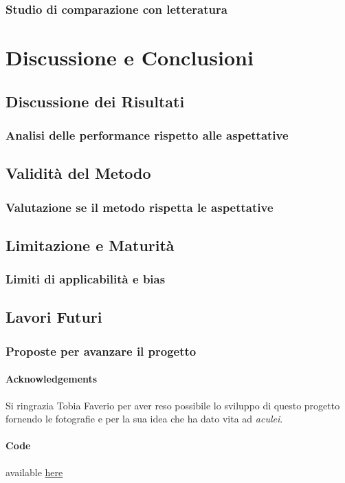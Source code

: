 \documentclass[12pt,a4paper,twoside]{article}
\begin{document}
\subsubsection{Studio di comparazione con letteratura}

\newpage
\section{Discussione e Conclusioni}

\subsection{Discussione dei Risultati}
\subsubsection{Analisi delle performance rispetto alle aspettative}

\subsection{Validità del Metodo}
\subsubsection{Valutazione se il metodo rispetta le aspettative}

\subsection{Limitazione e Maturità}
\subsubsection{Limiti di applicabilità e bias}

\subsection{Lavori Futuri}
\subsubsection{Proposte per avanzare il progetto}

\newpage
\paragraph{Acknowledgements} Si ringrazia Tobia Faverio per aver reso possibile lo sviluppo di 
questo progetto fornendo le fotografie e per la sua idea che ha dato vita ad \textit{aculei}.

\paragraph{Code} available \href{https://gitlab.com/micheledinelli/aculei-ai}{here}

\newpage
\begin{refcontext}[sorting=none]
    \printbibliography
\end{refcontext}
\end{document}

